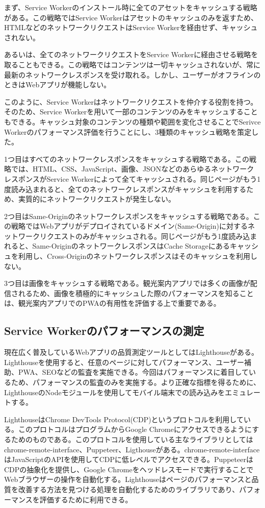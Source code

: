 まず、Service Workerのインストール時に全てのアセットをキャッシュする戦略がある。この戦略ではService Workerはアセットのキャッシュのみを返すため、HTMLなどのネットワークリクエストはService Workerを経由せず、キャッシュされない。

あるいは、全てのネットワークリクエストをService Workerに経由させる戦略を取ることもできる。この戦略ではコンテンツは一切キャッシュされないが、常に最新のネットワークレスポンスを受け取れる。しかし、ユーザーがオフラインのときはWebアプリが機能しない。

このように、Service Workerはネットワークリクエストを仲介する役割を持つ。そのため、Service Workerを用いて一部のコンテンツのみをキャッシュすることもできる。キャッシュ対象のコンテンツの種類や範囲を変化させることでSerivce Workerのパフォーマンス評価を行うことにし、3種類のキャッシュ戦略を策定した。

1つ目はすべてのネットワークレスポンスをキャッシュする戦略である。この戦略では、HTML、CSS、JavaScript、画像、JSONなどのあらゆるネットワークレスポンスがService Workerによって全てキャッシュされる。同じページがもう1度読み込まれると、全てのネットワークレスポンスがキャッシュを利用するため、実質的にネットワークリクエストが発生しない。

2つ目はSame-Originのネットワークレスポンスをキャッシュする戦略である。この戦略ではWebアプリがデプロイされているドメイン(Same-Origin)に対するネットワークリクエストのみがキャッシュされる。同じページがもう1度読み込まれると、Same-OriginのネットワークレスポンスはCache Storageにあるキャッシュを利用し、Cross-Originのネットワークレスポンスはそのキャッシュを利用しない。

3つ目は画像をキャッシュする戦略である。観光案内アプリでは多くの画像が配信されるため、画像を積極的にキャッシュした際のパフォーマンスを知ることは、観光案内アプリでのPWAの有用性を評価する上で重要である。
\subsection{Service Workerのパフォーマンスの測定}
\label{subsection:Service Workerのパフォーマンスの測定}
現在広く普及しているWebアプリの品質測定ツールとしてはLighthouseがある。Lighthouseを使用すると、任意のページに対してパフォーマンス、ユーザー補助、PWA、SEOなどの監査を実施できる。今回はパフォーマンスに着目しているため、パフォーマンスの監査のみを実施する。より正確な指標を得るために、LighthouseのNodeモジュールを使用してモバイル端末での読み込みをエミュレートする。

LighthouseはChrome DevTools Protocol(CDP)というプロトコルを利用している。このプロトコルはプログラムからGoogle Chromeにアクセスできるようにするためのものである。このプロトコルを使用している主なライブラリとしてはchrome-remote-interface、Puppeteer、Ligthouseがある。chrome-remote-interfaceはJavaScriptのAPIを使用してCDPに低レベルでアクセスできる。PuppeteerはCDPの抽象化を提供し、Google Chromeをヘッドレスモードで実行することでWebブラウザーの操作を自動化する。Lighthouseはページのパフォーマンスと品質を改善する方法を見つける処理を自動化するためのライブラリであり、パフォーマンスを評価するために利用できる。

